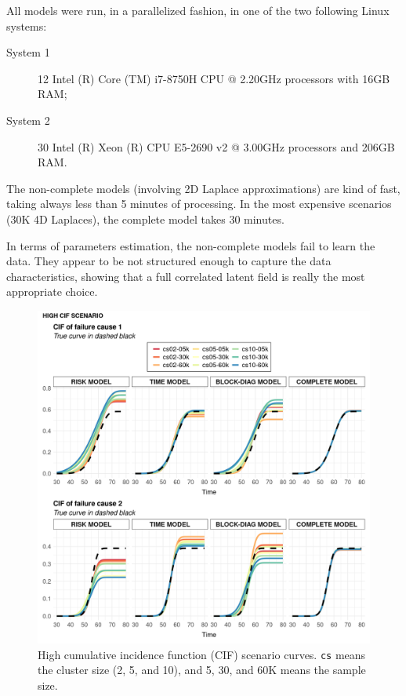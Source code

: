 \documentclass[a4paper,12pt]{article}
\begin{document}
All models were run, in a parallelized fashion, in one of the two
following Linux systems:
\begin{description}
 \item[System 1] 12 Intel (R) Core (TM) i7-8750H CPU @ 2.20GHz
   processors with 16GB RAM;
 \item[System 2] 30 Intel (R) Xeon (R) CPU E5-2690 v2 @ 3.00GHz
   processors and 206GB RAM.
\end{description}

The non-complete models (involving 2D Laplace approximations) are kind
of fast, taking always less than 5 minutes of processing. In the most
expensive scenarios (30K 4D Laplaces), the complete model takes 30
minutes.

In terms of parameters estimation, the non-complete models fail to learn
the data. They appear to be not structured enough to capture the data
characteristics, showing that a full correlated latent field is really
the most appropriate choice.

\begin{figure}[H]
 \centering
 \includegraphics[width=\linewidth]{../../THESIS/thesis/figures/cifs-1.png}
 \vspace{-0.75cm}
 \caption{High cumulative incidence function (CIF) scenario
   curves. \texttt{cs} means the cluster size (2, 5, and 10), and 5, 30,
   and 60K means the sample size.}
 \label{fig:cifshigh}
\end{figure}
\end{document}
